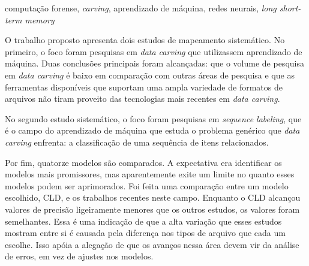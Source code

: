 \documentclass[english,oneside]{pucrs-ppgcc}
\begin{document}
\begin{resumo}{computação forense, \textit{carving}, aprendizado de máquina, redes neurais, \textit{long short-term memory}}

O trabalho proposto apresenta dois estudos de mapeamento sistemático.
No primeiro, o foco foram pesquisas em \textit{data carving} que utilizassem aprendizado de máquina. Duas conclusões principais foram alcançadas: que o volume de pesquisa em \textit{data carving} é baixo em comparação com outras áreas de pesquisa e que as ferramentas disponíveis que suportam uma ampla variedade de formatos de arquivos não tiram proveito das tecnologias mais recentes em \textit{data carving}.

No segundo estudo sistemático, o foco foram pesquisas em \textit{sequence labeling}, que é o campo do aprendizado de máquina que estuda o problema genérico que \textit{data carving} enfrenta: a classificação de uma sequência de itens relacionados. 

Por fim, quatorze modelos são comparados. A expectativa era identificar os modelos mais promissores, mas aparentemente exite um limite no quanto esses modelos podem ser aprimorados.
Foi feita uma comparação entre um modelo escolhido, CLD, e os trabalhos recentes neste campo. Enquanto o CLD alcançou valores de precisão ligeiramente menores que os outros estudos, os valores foram semelhantes. Essa é uma indicação de que a alta variação que esses estudos mostram entre si é causada pela diferença nos tipos de arquivo que cada um escolhe. Isso apóia a alegação de que os avanços nessa área devem vir da análise de erros, em vez de ajustes nos modelos.
\end{resumo}
\end{document}
